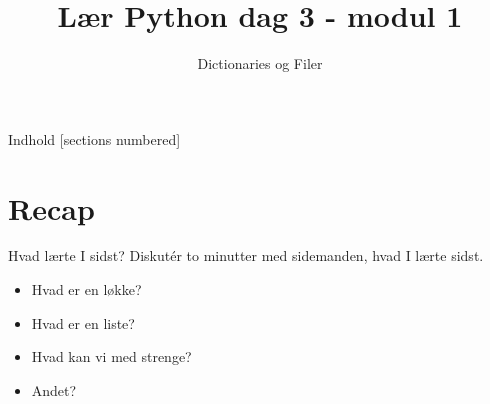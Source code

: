 

\title{Lær Python dag 3 - modul 1}
\subtitle{Dictionaries og Filer}



\maketitle

\begin{frame}{Indhold}
  [sections numbered]
  \tableofcontents[hideallsubsections]
\end{frame}

\section{Recap}
\begin{frame}[fragile]{Hvad lærte I sidst?}
	Diskutér to minutter med sidemanden, hvad I lærte sidst.
	
	\begin{itemize}
		\item Hvad er en løkke?
		\item Hvad er en liste?
		\item Hvad kan vi med strenge?
		\item Andet?
	\end{itemize}
\end{frame}

